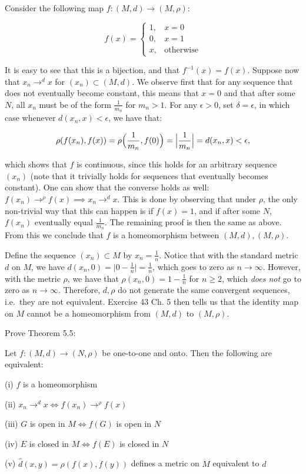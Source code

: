 \begin{solution}
    
    Consider the following map $f: (M, d) \rightarrow (M, \rho)$:
    
    \[f(x) = \begin{cases}
        1, & x = 0 \\
        0, & x = 1 \\
        x, & \text{otherwise}
    \end{cases}\]

    It is easy to see that this is a bijection, and that $f^{-1}(x) = f(x)$.
    Suppose now that $x_n \rightarrow^{d} x$ for $(x_n) \subset (M, d)$.
    We observe first that for any sequence that does not eventually become constant, this means that $x = 0$ and that after some $N$, all $x_n$ must be of the form $\frac{1}{m_n}$ for $m_n > 1$.
    For any $\epsilon > 0$, set $\delta = \epsilon$, in which case whenever $d(x_n, x) < \epsilon$, we have that:

    \[\rho(f(x_n), f(x)) = \rho\Bigl(\frac{1}{m_n}, f(0)\Bigr) = \Bigl\lvert \frac{1}{m_n} \Bigr\rvert = d(x_n, x) < \epsilon,\]

    which shows that $f$ is continuous, since this holds for an arbitrary sequence $(x_n)$ (note that it trivially holds for sequences that eventually becomes constant).
    One can show that the converse holds as well: $f(x_n) \rightarrow^{\rho} f(x) \implies x_n \rightarrow^{d} x$.
    This is done by observing that under $\rho$, the only non-trivial way that this can happen is if $f(x) = 1$, and if after some $N$, $f(x_n)$ eventually equal $\frac{1}{m_n}$.
    The remaining proof is then the same as above.
    From this we conclude that $f$ is a homeomorphism between $(M, d), (M, \rho)$.

    Define the sequence $(x_n) \subset M$ by $x_n = \frac{1}{n}$.
    Notice that with the standard metric $d$ on $M$, we have $d(x_n, 0) = \lvert 0 - \frac{1}{n} \rvert = \frac{1}{n}$, which goes to zero as $n \rightarrow \infty$.
    However, with the metric $\rho$, we have that $\rho(x_n, 0) = 1 - \frac{1}{n}$ for $n \geq 2$, which \textit{does not} go to zero as $n \rightarrow \infty$.
    Therefore, $d, \rho$ do not generate the same convergent sequences, i.e.\ they are not equivalent.
    Exercise 43 Ch. 5 then tells us that the identity map on $M$ cannot be a homeomorphism from $(M, d)$ to $(M, \rho)$.
\end{solution}

\begin{exercise}{52}
    Prove Theorem 5.5:

    Let $f: (M, d) \rightarrow (N, \rho)$ be one-to-one and onto.
    Then the following are equivalent:

    (i) $f$ is a homeomorphism

    (ii) $x_n \rightarrow^{d} x \iff f(x_n) \rightarrow^{\rho} f(x)$ 

    (iii) $G$ is open in $M \iff f(G)$  is open in $N$

    (iv) $E$ is closed in $M \iff f(E)$ is closed in $N$

    (v) $\hat{d}(x, y) = \rho(f(x), f(y))$ defines a metric on $M$ equivalent to $d$
\end{exercise}

